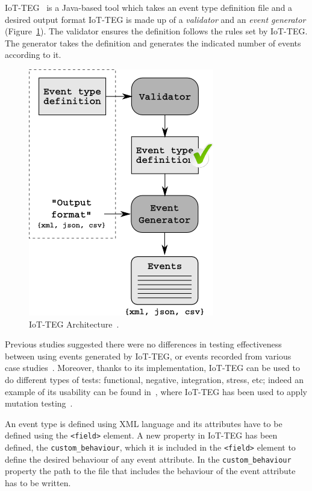 \documentclass[journal]{IEEEtran}
\begin{document}
IoT-TEG~\cite{TesisGutierrez2017,Gutierrez2017} is a Java-based tool which takes an event 
type definition file and a desired output format %
IoT-TEG is made up of a \emph{validator} and an \emph{event generator} 
(Figure~\ref{fig:IoT-EGArquitecture}). The validator ensures the definition follows the rules set 
by IoT-TEG. The generator takes the definition and generates the indicated number of events according to it.

\begin{figure}[!ht]
  \centering
  \includegraphics[scale=0.4]{./img/IoT-EGArquitecture}
  \caption[IoT-TEG Architecture]{IoT-TEG Architecture~\cite{TesisGutierrez2017,Gutierrez2017}.}
  \label{fig:IoT-EGArquitecture}
\end{figure}

Previous studies suggested there were no differences in testing effectiveness between using events
generated by IoT-TEG, or events recorded from various case studies~\cite{TesisGutierrez2017,Gutierrez2017}.
Moreover, thanks to its implementation, IoT-TEG can be used to do different types of tests: functional,
negative, integration, stress, etc; indeed an example of its usability can be found 
in~\cite{TesisGutierrez2017,gutierrez2018}, where IoT-TEG has been used to apply mutation 
testing~\cite{jia2011}. 

An event type is defined using XML language and its attributes have to be defined using the \texttt{\small{<field>}} element. 
A new property in IoT-TEG has been defined, the \texttt{\small{custom\_behaviour}}, which it is included in the 
\texttt{\small{<field>}} element to define the desired behaviour of any event attribute. In the \texttt{\small{custom\_behaviour}} 
property the path to the file that includes the behaviour of the event attribute has to be written. 
\end{document}
